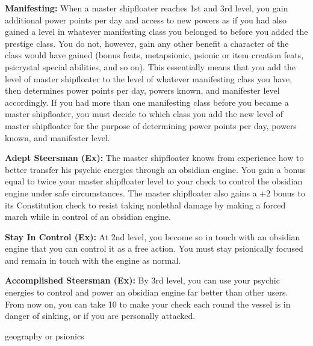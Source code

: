 {
\textbf{Manifesting:} When a master shipfloater reaches 1st and 3rd level, you gain additional power points per day and access to new powers as if you had also gained a level in whatever manifesting class you belonged to before you added the prestige class. You do not, however, gain any other benefit a character of the class would have gained (bonus feats, metapsionic, psionic or item creation feats, psicrystal special abilities, and so on). This essentially means that you add the level of master shipfloater to the level of whatever manifesting class you have, then determines power points per day, powers known, and manifester level accordingly. If you had more than one manifesting class before you became a master shipfloater, you must decide to which class you add the new level of master shipfloater for the purpose of determining power points per day, powers known, and manifester level.

\textbf{Adept Steersman (Ex):} The master shipfloater knows from experience how to better transfer his psychic energies through an obsidian engine. You gain a bonus equal to twice your master shipfloater level to your  check to control the obsidian engine under safe circumstances. The master shipfloater also gains a +2 bonus to its Constitution check to resist taking nonlethal damage by making a forced march while in control of an obsidian engine.

\textbf{Stay In Control (Ex):} At 2nd level, you become so in touch with an obsidian engine that you can control it as a free action. You must stay psionically focused and remain in touch with the engine as normal.

\textbf{Accomplished Steersman (Ex):} By 3rd level, you can use your psychic energies to control and power an obsidian engine far better than other users. From now on, you can take 10 to make your  check each round the vessel is in danger of sinking, or if you are personally attacked.
}
{}
{geography or psionics}
{}
{}
{}